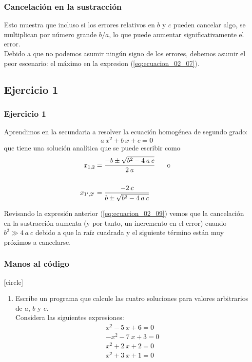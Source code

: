 \begin{frame}
\frametitle{Cancelación en la sustracción}
Esto muestra que incluso si los errores relativos en $b$ y $c$ pueden cancelar algo, se multiplican por número grande $b / a$, lo que puede aumentar significativamente el error.
\\
\bigskip
Debido a que no podemos asumir ningún signo de los errores, debemos asumir el peor escenario: el máximo en la expresion (\ref{eq:ecuacion_02_07}).
\end{frame}
\subsection{Ejercicio 1}
\begin{frame}
\frametitle{Ejercicio 1}
Aprendimos en la secundaria a resolver la ecuación homogénea de segundo grado:
\begin{equation}
a \: x^{2} + b \: x + c = 0
\label{eq:ecuacion_02_08}
\end{equation}
que tiene una solución analítica que se puede escribir como
\\
\medskip
\begin{align}
\begin{aligned}
x_{1, 2} &= \dfrac{-b \pm \sqrt{b^{2} - 4 \: a \: c}}{2 \: a} \hspace{0.5cm} \mbox{ o } \\
\\
x_{1^{\prime}, 2^{\prime}} &= \dfrac{-2 \: c}{b \pm \sqrt{b^{2} - 4 \: a \: c}}
\end{aligned}
\label{eq:ecuacion_02_09}
\end{align}
\end{frame}
\begin{frame}
Revisando la expresión anterior (\ref{eq:ecuacion_02_09}) vemos que la cancelación en la sustracción aumenta (y por tanto, un incremento en el error) cuando $b^{2} \gg 4 \: a \: c$ debido a que la raíz cuadrada y el siguiente término están muy próximos a cancelarse.
\end{frame}
\begin{frame}
\frametitle{Manos al código}
[circle]
\begin{enumerate}[<+->]
\item Escribe un programa que calcule las cuatro soluciones para valores arbitrarios de $a$, $b$ y $c$. \\
Considera las siguientes expresiones:
\begin{align*}
x^{2} - 5 \: x + 6 = 0 \\
- x^{2} - 7 \: x + 3 = 0 \\
x^{2} + 2 \: x + 2 = 0 \\
x^{2} + 3 \: x + 1 = 0
\end{align*}
\seti
\end{enumerate}
\end{frame}
